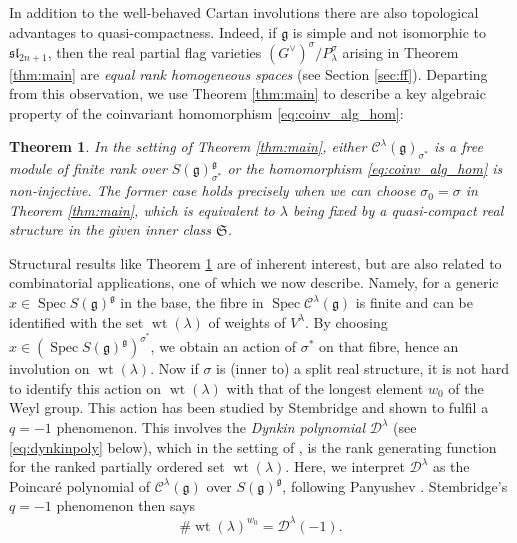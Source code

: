 \documentclass{amsart}
\newcommand{\Kir}{\mathcal{C}}
\newcommand{\D}{\mathcal{D}}
\newcommand{\g}{\mathfrak{g}}
\renewcommand{\sl}{\mathfrak{sl}}
\newcommand{\Spec}{\operatorname{Spec}}
\newcommand{\wt}{\operatorname{wt}}
\theoremstyle{definition}
\theoremstyle{plain}
\newtheorem{thm}[defn]{Theorem}
\theoremstyle{remark}
\begin{document}
In addition to the well-behaved Cartan involutions there are also topological advantages to quasi-compactness. Indeed, if $\g$ is simple and not isomorphic to $\sl_{2n+1}$, then the real partial flag varieties $(G^\vee)^\sigma/P_\lambda^\sigma$ arising in Theorem \ref{thm:main} are \emph{equal rank homogeneous spaces} (see Section \ref{sec:ff}). Departing from this observation, we use Theorem \ref{thm:main} to describe a key algebraic property of the coinvariant homomorphism \eqref{eq:coinv_alg_hom}:
\begin{thm}
\label{thm:degeneracy}
    In the setting of Theorem \ref{thm:main}, either $\Kir^\lambda(\g)_{\sigma^*}$ is a free module of finite rank over $S(\g)^\g_{\sigma^*}$ or the homomorphism \eqref{eq:coinv_alg_hom} is non-injective. The former case holds precisely when we can choose $\sigma_0 = \sigma$ in Theorem \ref{thm:main}, which is equivalent to $\lambda$ being fixed by a quasi-compact real structure in the given inner class $\mathfrak{S}$. 
\end{thm}
Structural results like Theorem \ref{thm:degeneracy} are of inherent interest, but are also related to combinatorial applications, one of which we now describe. Namely, for a generic $x\in \Spec S(\g)^\g$ in the base, the fibre in $\Spec \Kir^\lambda(\g)$ is finite and can be identified with the set $\wt (\lambda)$ of weights of $V^\lambda$. By choosing $x\in (\Spec S(\g)^\g)^{\sigma^*}$, we obtain an action of $\sigma^*$ on that fibre, hence an involution on $\wt (\lambda)$. Now if $\sigma$ is (inner to) a split real structure, it is not hard to identify this action on $\wt (\lambda)$ with that of the longest element $w_0$ of the Weyl group. This action has been studied by Stembridge \cite{Stembridge1994_minuscule} and shown to fulfil a $q=-1$ phenomenon. This involves the \emph{Dynkin polynomial} $\D^\lambda$ (see \eqref{eq:dynkinpoly} below), which in the setting of \cite{Stembridge1994_minuscule}, is the rank generating function for the ranked partially ordered set $\wt(\lambda)$. Here, we interpret $\D^\lambda$ as the Poincaré polynomial of $\Kir^\lambda(\g)$ over $S(\g)^\g$, following Panyushev \cite{Panyushev2004_endoj}. Stembridge's $q=-1$ phenomenon then says
\begin{equation}
\label{eq:q=-1}
    \#\wt(\lambda)^{w_0} = \D^\lambda(-1).
\end{equation}
\end{document}
